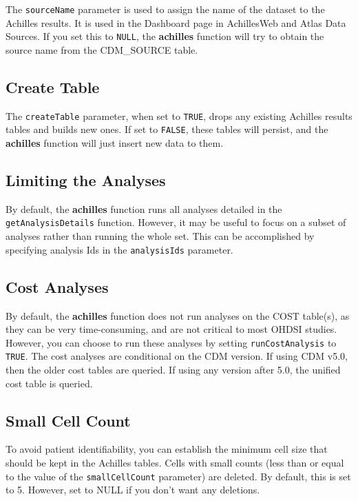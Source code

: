 \documentclass[]{article}
\begin{document}
The \texttt{sourceName} parameter is used to assign the name of the
dataset to the Achilles results. It is used in the Dashboard page in
AchillesWeb and Atlas Data Sources. If you set this to \texttt{NULL},
the \textbf{achilles} function will try to obtain the source name from
the CDM\_SOURCE table.

\subsection{Create Table}\label{create-table}

The \texttt{createTable} parameter, when set to \texttt{TRUE}, drops any
existing Achilles results tables and builds new ones. If set to
\texttt{FALSE}, these tables will persist, and the \textbf{achilles}
function will just insert new data to them.

\subsection{Limiting the Analyses}\label{limiting-the-analyses}

By default, the \textbf{achilles} function runs all analyses detailed in
the \texttt{getAnalysisDetails} function. However, it may be useful to
focus on a subset of analyses rather than running the whole set. This
can be accomplished by specifying analysis Ids in the
\texttt{analysisIds} parameter.

\subsection{Cost Analyses}\label{cost-analyses}

By default, the \textbf{achilles} function does not run analyses on the
COST table(s), as they can be very time-consuming, and are not critical
to most OHDSI studies. However, you can choose to run these analyses by
setting \texttt{runCostAnalysis} to \texttt{TRUE}. The cost analyses are
conditional on the CDM version. If using CDM v5.0, then the older cost
tables are queried. If using any version after 5.0, the unified cost
table is queried.

\subsection{Small Cell Count}\label{small-cell-count}

To avoid patient identifiability, you can establish the minimum cell
size that should be kept in the Achilles tables. Cells with small counts
(less than or equal to the value of the \texttt{smallCellCount}
parameter) are deleted. By default, this is set to 5. However, set to
NULL if you don't want any deletions.
\end{document}

